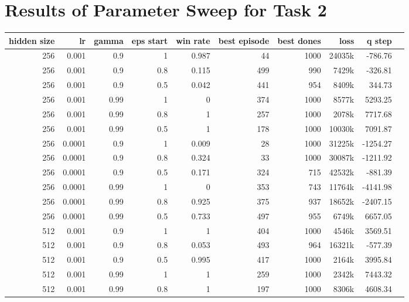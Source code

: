 \renewcommand{\topfraction}{1}
\renewcommand{\bottomfraction}{1}
\renewcommand{\textfraction}{0}
\renewcommand{\floatpagefraction}{1}

\renewcommand{\thesection}{Appendix B}
\section{Results of Parameter Sweep for Task 2}
\label{param_sweep_result_appendix_task2}

\begin{table}[h]
	\centering
	\scriptsize
	\begin{tabular}{r r r r | r r r r r r}
		\toprule
			hidden size & lr & gamma & eps start & win rate & best episode & best dones & loss & q step \\
		\midrule
			256 & 0.001 & 0.9 & 1 & 0.987 & 44 & 1000 & 24035k & -786.76 \\
			256 & 0.001 & 0.9 & 0.8 & 0.115 & 499 & 990 & 7429k & -326.81 \\
			256 & 0.001 & 0.9 & 0.5 & 0.042 & 441 & 954 & 8409k & 344.73 \\
			256 & 0.001 & 0.99 & 1 & 0 & 374 & 1000 & 8577k & 5293.25 \\
			256 & 0.001 & 0.99 & 0.8 & 1 & 257 & 1000 & 2078k & 7717.68 \\
			256 & 0.001 & 0.99 & 0.5 & 1 & 178 & 1000 & 10030k & 7091.87 \\
			256 & 0.0001 & 0.9 & 1 & 0.009 & 28 & 1000 & 31225k & -1254.27 \\
			256 & 0.0001 & 0.9 & 0.8 & 0.324 & 33 & 1000 & 30087k & -1211.92 \\
			256 & 0.0001 & 0.9 & 0.5 & 0.171 & 324 & 715 & 42532k & -881.39 \\
			256 & 0.0001 & 0.99 & 1 & 0 & 353 & 743 & 11764k & -4141.98 \\
			256 & 0.0001 & 0.99 & 0.8 & 0.925 & 375 & 937 & 18652k & -2407.15 \\
			256 & 0.0001 & 0.99 & 0.5 & 0.733 & 497 & 955 & 6749k & 6657.05 \\
			512 & 0.001 & 0.9 & 1 & 1 & 404 & 1000 & 4546k & 3569.51 \\
			512 & 0.001 & 0.9 & 0.8 & 0.053 & 493 & 964 & 16321k & -577.39 \\
			512 & 0.001 & 0.9 & 0.5 & 0.995 & 417 & 1000 & 2164k & 3995.84 \\
			512 & 0.001 & 0.99 & 1 & 1 & 259 & 1000 & 2342k & 7443.32 \\
			512 & 0.001 & 0.99 & 0.8 & 1 & 197 & 1000 & 8306k & 4608.34 \\

\end{tabular}
\end{table}
